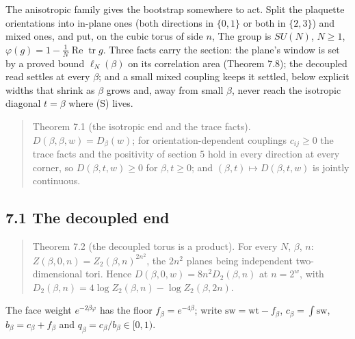 \documentclass[10pt,letterpaper,twocolumn]{article}
\begin{document}
The anisotropic family gives the bootstrap somewhere to act. Split the plaquette orientations into in-plane ones (both directions in \(\{0,1\}\) or both in \(\{2,3\}\)) and mixed ones, and put, on the cubic torus of side \(n\),
The group is \(SU(N)\), \(N\ge1\), \(\varphi(g)=1-\tfrac1N\operatorname{Re}\operatorname{tr}g\). Three facts carry the section: the plane's window is set by a proved bound \(\ell_N(\beta)\) on its correlation area (Theorem 7.8); the decoupled read settles at every \(\beta\); and a small mixed coupling keeps it settled, below explicit widths that shrink as \(\beta\) grows and, away from small \(\beta\), never reach the isotropic diagonal \(t=\beta\) where (S) lives.

\begin{quote}
Theorem 7.1 (the isotropic end and the trace facts). \(D(\beta,\beta,w)=D_\beta(w)\); for orientation-dependent couplings \(c_{ij}\ge0\) the trace facts and the positivity of section 5 hold in every direction at every corner, so \(D(\beta,t,w)\ge0\) for \(\beta,t\ge0\); and \((\beta,t)\mapsto D(\beta,t,w)\) is jointly continuous.
\end{quote}

\subsection{7.1 The decoupled end}\label{71-the-decoupled-end}

\begin{quote}
Theorem 7.2 (the decoupled torus is a product). For every \(N\), \(\beta\), \(n\): \(Z(\beta,0,n)=Z_2(\beta,n)^{2n^2}\), the \(2n^2\) planes being independent two-dimensional tori. Hence \(D(\beta,0,w)=8n^2D_2(\beta,n)\) at \(n=2^w\), with \(D_2(\beta,n)=4\log Z_2(\beta,n)-\log Z_2(\beta,2n)\).
\end{quote}

The face weight \(e^{-2\beta\varphi}\) has the floor \(f_\beta=e^{-4\beta}\); write \(\mathrm{sw}=\mathrm{wt}-f_\beta\), \(c_\beta=\int\mathrm{sw}\), \(b_\beta=c_\beta+f_\beta\) and \(q_\beta=c_\beta/b_\beta\in[0,1)\).
\end{document}
